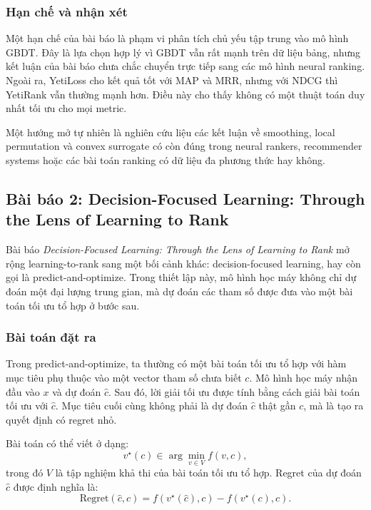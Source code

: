 \subsubsection{Hạn chế và nhận xét}

Một hạn chế của bài báo là phạm vi phân tích chủ yếu tập trung vào mô hình GBDT. Đây là lựa chọn hợp lý vì GBDT vẫn rất mạnh trên dữ liệu bảng, nhưng kết luận của bài báo chưa chắc chuyển trực tiếp sang các mô hình neural ranking. Ngoài ra, YetiLoss cho kết quả tốt với MAP và MRR, nhưng với NDCG thì YetiRank vẫn thường mạnh hơn. Điều này cho thấy không có một thuật toán duy nhất tối ưu cho mọi metric.

Một hướng mở tự nhiên là nghiên cứu liệu các kết luận về smoothing, local permutation và convex surrogate có còn đúng trong neural rankers, recommender systems hoặc các bài toán ranking có dữ liệu đa phương thức hay không.

\subsection{Bài báo 2: Decision-Focused Learning: Through the Lens of Learning to Rank}

Bài báo \textit{Decision-Focused Learning: Through the Lens of Learning to Rank} mở rộng learning-to-rank sang một bối cảnh khác: decision-focused learning, hay còn gọi là predict-and-optimize. Trong thiết lập này, mô hình học máy không chỉ dự đoán một đại lượng trung gian, mà dự đoán các tham số được đưa vào một bài toán tối ưu tổ hợp ở bước sau.

\subsubsection{Bài toán đặt ra}

Trong predict-and-optimize, ta thường có một bài toán tối ưu tổ hợp với hàm mục tiêu phụ thuộc vào một vector tham số chưa biết \(c\). Mô hình học máy nhận đầu vào \(x\) và dự đoán \(\hat{c}\). Sau đó, lời giải tối ưu được tính bằng cách giải bài toán tối ưu với \(\hat{c}\). Mục tiêu cuối cùng không phải là dự đoán \(\hat{c}\) thật gần \(c\), mà là tạo ra quyết định có regret nhỏ.

Bài toán có thể viết ở dạng:
\begin{equation}
    v^\star(c)
    \in
    \arg\min_{v\in V}
    f(v,c),
    \label{eq:section10-dfl-optimization}
\end{equation}
trong đó \(V\) là tập nghiệm khả thi của bài toán tối ưu tổ hợp. Regret của dự đoán \(\hat{c}\) được định nghĩa là:
\begin{equation}
    \mathrm{Regret}(\hat{c},c)
    =
    f(v^\star(\hat{c}),c)
    -
    f(v^\star(c),c).
    \label{eq:section10-dfl-regret}
\end{equation}

